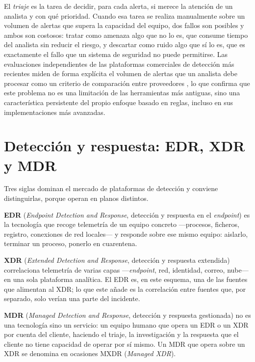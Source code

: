 El \emph{triaje} es la tarea de decidir, para cada alerta, si merece la atención de un analista y
con qué prioridad. Cuando esa tarea se realiza manualmente sobre un volumen de alertas que supera
la capacidad del equipo, dos fallos son posibles y ambos son costosos: tratar como amenaza algo que
no lo es, que consume tiempo del analista sin reducir el riesgo, y descartar como ruido algo que sí
lo es, que es exactamente el fallo que un sistema de seguridad no puede permitirse. Las evaluaciones
independientes de las plataformas comerciales de detección más recientes miden de forma explícita
el volumen de alertas que un analista debe procesar como un criterio de comparación entre
proveedores \cite{mitreattackevals}, lo que confirma que este problema no es una limitación de las
herramientas más antiguas, sino una característica persistente del propio enfoque basado en reglas,
incluso en sus implementaciones más avanzadas.

\section{Detección y respuesta: EDR, XDR y MDR}

Tres siglas dominan el mercado de plataformas de detección y conviene distinguirlas, porque operan
en planos distintos.

\textbf{EDR} (\emph{Endpoint Detection and Response}, detección y respuesta en el \emph{endpoint})
es la tecnología que recoge telemetría de un equipo concreto ---procesos, ficheros, registro,
conexiones de red locales--- y responde sobre ese mismo equipo: aislarlo, terminar un proceso,
ponerlo en cuarentena.

\textbf{XDR} (\emph{Extended Detection and Response}, detección y respuesta extendida) correlaciona
telemetría de varias capas ---\emph{endpoint}, red, identidad, correo, nube--- en una sola plataforma
analítica. El EDR es, en este esquema, una de las fuentes que alimentan al XDR; lo que este añade
es la correlación entre fuentes que, por separado, solo verían una parte del incidente.

\textbf{MDR} (\emph{Managed Detection and Response}, detección y respuesta gestionada) no es una
tecnología sino un servicio: un equipo humano que opera un EDR o un XDR por cuenta del cliente,
haciendo el triaje, la investigación y la respuesta que el cliente no tiene capacidad de operar por
sí mismo. Un MDR que opera sobre un XDR se denomina en ocasiones MXDR (\emph{Managed XDR}).

